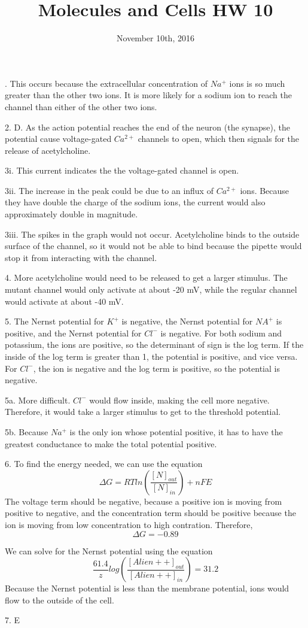 \documentclass{article}
\title{Molecules and Cells HW 10}
\date{November 10th, 2016}
\begin{document}
. This occurs because the extracellular concentration of $Na^+$ ions is so much greater than the other two ions. It is more likely for a sodium ion to reach the channel than either of the other two ions.

2. D. As the action potential reaches the end of the neuron (the synapse), the potential cause voltage-gated $Ca^{2+}$ channels to open, which then signals for the release of acetylcholine.

3i. This current indicates the the voltage-gated channel is open.

3ii. The increase in the peak could be due to an influx of $Ca^{2+}$ ions. Because they have double the charge of the sodium ions, the current would also approximately double in magnitude.

3iii. The spikes in the graph would not occur. Acetylcholine binds to the outside surface of the channel, so it would not be able to bind because the pipette would stop it from interacting with the channel.

4. More acetylcholine would need to be released to get a larger stimulus. The mutant channel would only activate at about -20 mV, while the regular channel would activate at about -40 mV.

5. The Nernst potential for $K^+$ is negative, the Nernst potential for $NA^+$ is positive, and the Nernst potential for $Cl^-$ is negative. For both sodium and potassium, the ions are positive, so the determinant of sign is the log term. If the inside of the log term is greater than 1, the potential is positive, and vice versa. For $Cl^-$, the ion is negative and the log term is positive, so the potential is negative.

5a.	More difficult. $Cl^-$ would flow inside, making the cell more negative. Therefore, it would take a larger stimulus to get to the threshold potential.

5b. Because $Na^+$ is the only ion whose potential positive, it has to have the greatest conductance to make the total potential positive.

6. To find the energy needed, we can use the equation
$$\Delta G = RTln(\frac{[N]_{out}}{[N]_{in}})+nFE$$
The voltage term should be negative, because a positive ion is moving from positive to negative, and the concentration term should be positive because the ion is moving from low concentration to high contration. Therefore,
$$\Delta G = -0.89$$

We can solve for the Nernst potential using the equation
$$\frac{61.4}{z}log(\frac{[Alien++]_{out}}{[Alien++]_{in}})=31.2$$
Because the Nernst potential is less than the membrane potential, ions would flow to the outside of the cell.

7. E
\end{document}
